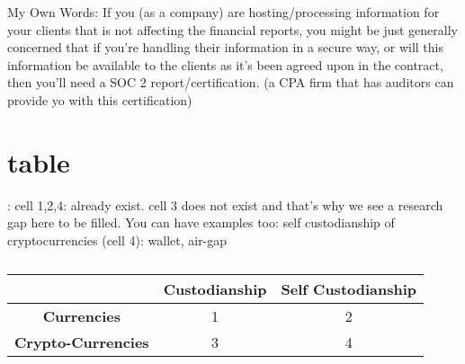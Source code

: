 My Own Words: If you (as a company) are hosting/processing information for your clients that is not affecting the financial reports, you might be just generally concerned that if you're handling their information in a secure way, or will this information be available to the clients as it's been agreed upon in the contract, then you'll need a SOC 2 report/certification.  (a CPA firm that has auditors can provide yo with this certification)
 
 \section{table} : cell 1,2,4: already exist.  cell 3 does not exist and that's why we see a research gap here to be filled.
 You can have examples too: self custodianship of cryptocurrencies (cell 4): wallet, air-gap

 \begin{table}[t]
\centering
\begin{tabular}{|c|c|c|}  
\hline
& \textbf{Custodianship} & \textbf{Self Custodianship}   \\ \hline
\textbf{Currencies} & 1 & 2 \\ \hline
\textbf{Crypto-Currencies} & 3 & 4 \\
\hline
\end{tabular}
\caption{\footnotesize{}\label{tab:}}
\end{table}







\nocite{*}
